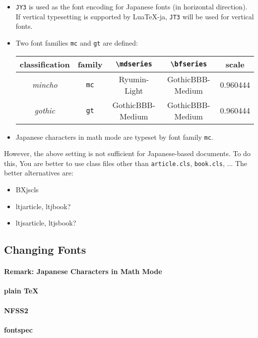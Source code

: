 \documentclass[a4paper,titlepage]{article}
\begin{document}
\begin{itemize}
\item {\tt JY3} is used as the font encoding for Japanese fonts (in horizontal direction).\\
If vertical typesetting is supported by Lua\TeX-ja, {\tt JT3} will be used for vertical fonts.
\item Two font families {\tt mc} and {\tt gt} are defined: 
\begin{center}
\begin{tabular}{ccccc}
\toprule
\textbf{classification}&\textbf{family}&\verb+\mdseries+&\verb+\bfseries+&\textbf{scale}\\\midrule
\textit{mincho}&\tt mc&Ryumin-Light    &GothicBBB-Medium&0.960444\\
\textit{gothic}&\tt gt&GothicBBB-Medium&GothicBBB-Medium&0.960444\\
\bottomrule
\end{tabular}
\end{center}
\item Japanese characters in math mode are typeset by font family {\tt mc}.
\end{itemize}

However, the above setting is not sufficient for Japanese-based documents. To do this, 
You are better to use class files other than {\tt article.cls}, {\tt book.cls}, ...
The better alternatives are:
\begin{itemize}
\item BXjscls
\item ltjarticle, ltjbook?
\item ltjsarticle, ltjsbook?
\end{itemize}

\subsection{Changing Fonts}
\paragraph{Remark: Japanese Characters in Math Mode}


\paragraph{plain \TeX}
\paragraph{NFSS2}
\paragraph{fontspec}
\end{document}
